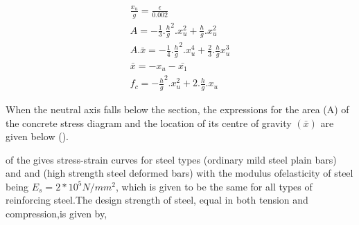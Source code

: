 \begin{align}
\frac{x_u}{g}=\frac{\epsilon}{0.002}\\
A=-\frac{1}{3}.\frac{h}{g}^2.x_u^2+\frac{h}{g}.x_u^2\\
A.\bar{x}=-\frac{1}{4}.\frac{h}{g}^2.x_u^4+\frac{2}{3}.\frac{h}{g}x_u^3\\
\bar{x}=-x_u-\bar{x_1}\\
f_c=-\frac{h}{g}^2.x_u^2+2.\frac{h}{g}.x_u
\end{align}

When the neutral axis falls below the section, the expressions for the
area (A) of the concrete stress diagram and the location of its centre
of gravity $(\bar x)$ are given below ().

{} of the  gives stress-strain curves for
steel types  (ordinary mild steel plain bars) and {\fefouronefive} and
{\fefivezerozero} (high strength steel deformed bars) with the modulus ofelasticity
of steel being $E_s = 2*10^5 N/mm^2$, which is given to be the same
for all types of reinforcing steel.The design strength of steel, equal
in both tension and compression,is given by,

